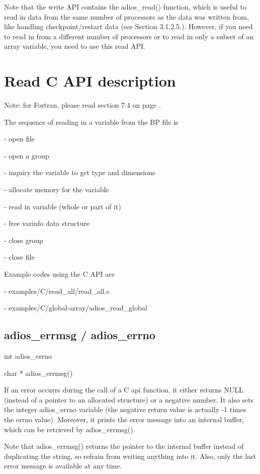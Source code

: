 Note that the write API contains the adios\_read() function, which is useful to 
read in data from the same number of processors as the data was written from, like 
handling checkpoint/restart data (see Section 3.1.2.5.). However, if you need to 
read in from a different number of processors or to read in only a subset of an 
array variable, you need to use this read API.\label{HToc182553398}

\section{Read C API description}

Note: for Fortran, please read section 7.4 on page \pageref{HRef144348801}.

The sequence of reading in a variable from the BP file is

- open file

- open a group

- inquiry the variable to get type and dimensions

- allocate memory for the variable

- read in variable (whole or part of it)

- free varinfo data structure

- close group

- close file

Example codes using the C API are 

\leftskip=36pt
- examples/C/read\_all/read\_all.c

- examples/C/global-array/adios\_read\_global\label{HToc182553399}

\subsection{adios\_errmsg / adios\_errno}

\leftskip=0pt
int    adios\_errno

char * adios\_errmsg()

If an error occurrs during the call of a C api function, it either returns NULL 
(instead of a pointer to an allocated structure) or a negative number. It also 
sets the integer adios\_errno variable (the negative return value is actually -1 
times the errno value). Moreover, it prints the error message into an internal 
buffer, which can be retrieved by adios\_errmsg(). 

Note that adios\_errmsg() returns the pointer to the internal buffer instead of 
duplicating the string, so refrain from writing anything into it. Also, only the 
last error message is available at any time.\label{HToc182553400}

